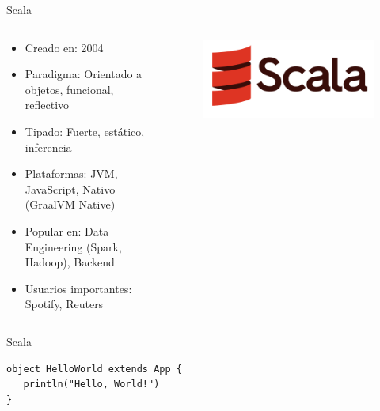 \documentclass[aspectratio=169]{beamer}
\begin{document}
\begin{frame}{Scala}
	\begin{columns}[T] %
		\begin{column}[T]{0.5\textwidth} %
			\begin{itemize}
				\item Creado en: 2004
				\item Paradigma: Orientado a objetos, funcional, reflectivo
				\item Tipado: Fuerte, estático, inferencia
				\item Plataformas: JVM, JavaScript, Nativo (GraalVM Native)
				\item Popular en: Data Engineering (Spark, Hadoop), Backend
				\item Usuarios importantes: Spotify, Reuters
			\end{itemize}
		\end{column}
		\begin{column}[T]{7cm} %
			\begin{figure}
				\centering
				\includegraphics[width=0.5\linewidth]{Images/scala}
			\end{figure}

		\end{column}
	\end{columns}
\end{frame}

\begin{frame}[fragile]{Scala}
\begin{lstlisting}
object HelloWorld extends App {
   println("Hello, World!")
}
\end{lstlisting}
\end{frame}
\end{document}

